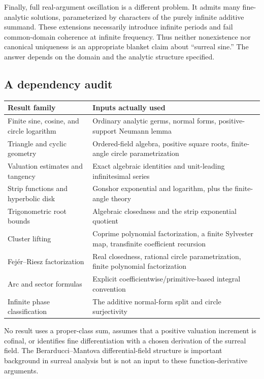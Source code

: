 \documentclass[11pt]{article}
\numberwithin{equation}{section}
\theoremstyle{definition}
\begin{document}
Finally, full real-argument oscillation is a different problem. It admits many fine-analytic solutions, parameterized by characters of the purely infinite additive summand. These extensions necessarily introduce infinite periods and fail common-domain coherence at infinite frequency. Thus neither nonexistence nor canonical uniqueness is an appropriate blanket claim about ``surreal sine.'' The answer depends on the domain and the analytic structure specified.

\subsection{A dependency audit}
\begin{center}
\small
\begin{tabular}{L{0.28\textwidth}L{0.62\textwidth}}
\toprule
Result family & Inputs actually used\\
\midrule
Finite sine, cosine, and circle logarithm & Ordinary analytic germs, normal forms, positive-support Neumann lemma\\
Triangle and cyclic geometry & Ordered-field algebra, positive square roots, finite-angle circle parametrization\\
Valuation estimates and tangency & Exact algebraic identities and unit-leading infinitesimal series\\
Strip functions and hyperbolic disk & Gonshor exponential and logarithm, plus the finite-angle theory\\
Trigonometric root bounds & Algebraic closedness and the strip exponential quotient\\
Cluster lifting & Coprime polynomial factorization, a finite Sylvester map, transfinite coefficient recursion\\
Fej\'er--Riesz factorization & Real closedness, rational circle parametrization, finite polynomial factorization\\
Arc and sector formulas & Explicit coefficientwise/primitive-based integral convention\\
Infinite phase classification & The additive normal-form split and circle surjectivity\\
\bottomrule
\end{tabular}
\end{center}
No result uses a proper-class sum, assumes that a positive valuation increment is cofinal, or identifies fine differentiation with a chosen derivation of the surreal field. The Berarducci--Mantova differential-field structure \cite{BM} is important background in surreal analysis but is not an input to these function-derivative arguments.
\end{document}

